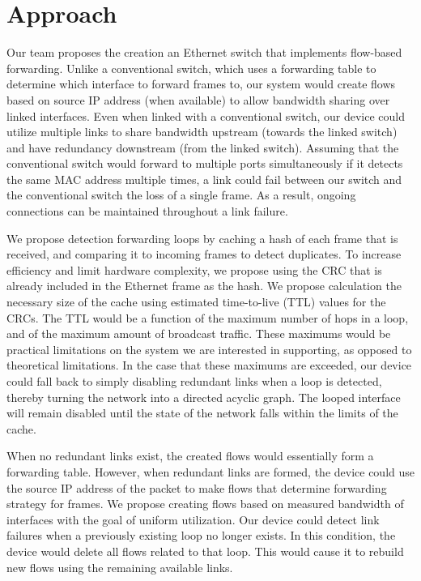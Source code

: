 \documentclass{article}
\begin{document}
\section{Approach}
	Our team proposes the creation an Ethernet switch that implements flow-based forwarding.
	Unlike a conventional switch, which uses a forwarding table to determine which interface to forward frames to, our system would create flows based on source IP address (when available) to allow bandwidth sharing over linked interfaces.
	Even when linked with a conventional switch, our device could utilize multiple links to share bandwidth upstream (towards the linked switch) and have redundancy downstream (from the linked switch).
	Assuming that the conventional switch would forward to multiple ports simultaneously if it detects the same MAC address multiple times, a link could fail between our switch and the conventional switch the loss of a single frame.
	As a result, ongoing connections can be maintained throughout a link failure.

	We propose detection forwarding loops by caching a hash of each frame that is received, and comparing it to incoming frames to detect duplicates.
	To increase efficiency and limit hardware complexity, we propose using the CRC that is already included in the Ethernet frame as the hash.
	We propose calculation the necessary size of the cache using estimated time-to-live (TTL) values for the CRCs.
	The TTL would be a function of the maximum number of hops in a loop, and of the maximum amount of broadcast traffic.
	These maximums would be practical limitations on the system we are interested in supporting, as opposed to theoretical limitations.
	In the case that these maximums are exceeded, our device could fall back to simply disabling redundant links when a loop is detected, thereby turning the network into a directed acyclic graph.
	The looped interface will remain disabled until the state of the network falls within the limits of the cache.
	
	When no redundant links exist, the created flows would essentially form a forwarding table.
	However, when redundant links are formed, the device could use the source IP address of the packet to make flows that determine forwarding strategy for frames.
	We propose creating flows based on measured bandwidth of interfaces with the goal of uniform utilization.
	Our device could detect link failures when a previously existing loop no longer exists.
	In this condition, the device would delete all flows related to that loop.
	This would cause it to rebuild new flows using the remaining available links.
\end{document}
